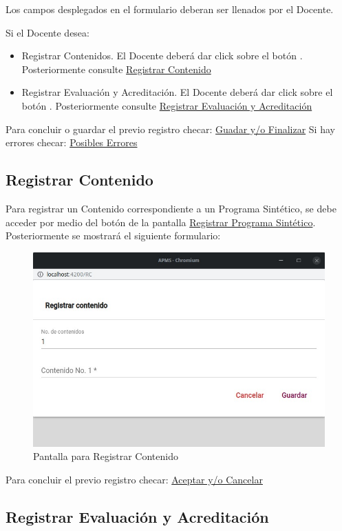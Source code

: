 Los campos desplegados en el formulario deberan ser llenados por el Docente.

Si el Docente desea:

\begin{itemize}
    \item Registrar Contenidos. El Docente deberá dar click sobre el botón . Posteriormente consulte \hyperlink{RegC}{Registrar Contenido}
    \item Registrar Evaluación y Acreditación. El Docente deberá dar click sobre el botón . Posteriormente consulte \hyperlink{RegEyA}{Registrar Evaluación y Acreditación}
\end{itemize}

Para concluir o guardar el previo registro checar: 
\hyperlink{GuardarFinalizar}{Guadar y/o Finalizar}
\pagebreak
Si hay errores checar: \hyperlink{Errores}{Posibles Errores}
\pagebreak

\hypertarget{RegC}{\subsection{Registrar Contenido}}

Para registrar un Contenido correspondiente a un Programa Sintético, se debe acceder por medio del botón  de la pantalla \hyperlink{RegistrarPS}{Registrar Programa Sintético}. Posteriormente se mostrará el siguiente formulario: 

\begin{figure}[!hbtp]
    \centering
    \hypertarget{RegC}{\includegraphics[width=0.5\linewidth]{images/SP6/11.jpeg}}
    \caption{Pantalla para Registrar Contenido}
\end{figure}
Para concluir el previo registro checar: 
\hyperlink{AceptarCancelar}{Aceptar y/o Cancelar}

\pagebreak
\hypertarget{RegEyA}{\subsection{Registrar Evaluación y Acreditación}}


